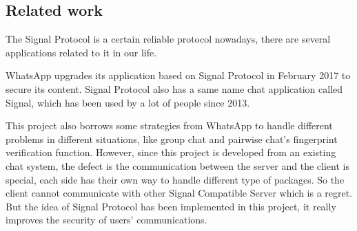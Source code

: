 \subsection{Related work}
The Signal Protocol is a certain reliable protocol nowadays, there are several applications related to it in our life.

WhatsApp upgrades its application based on Signal Protocol in February 2017 to secure its content. Signal Protocol also has a same name chat application called Signal, which has been used by a lot of people since 2013.

 This project also borrows some strategies from WhatsApp to handle different problems in different situations, like group chat and pairwise chat's fingerprint verification function. However, since this project is developed from an existing chat system, the defect is the communication between the server and the client is special, each side has their own way to handle different type of packages. So the client cannot communicate with other Signal Compatible Server which is a regret. But the idea of Signal Protocol has been implemented in this project, it really improves the security of users' communications.

\clearpage